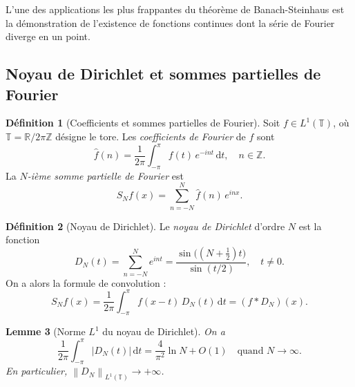 \documentclass[a4paper,12pt]{book}
\newcommand{\Z}{\mathbb{Z}}
\newcommand{\R}{\mathbb{R}}
\newcommand{\dd}{\mathrm{d}}
\newcommand{\norm}[1]{\left\| #1 \right\|}
\newcommand{\abs}[1]{\left| #1 \right|}
\theoremstyle{definition}
\newtheorem{definition}{Définition}[chapter]
\theoremstyle{plain}
\newtheorem{lemme}[definition]{Lemme}
\theoremstyle{remark}
\begin{document}

L'une des applications les plus frappantes du théorème de Banach-Steinhaus
est la démonstration de l'existence de fonctions continues dont la série de
Fourier diverge en un point.

\subsection{Noyau de Dirichlet et sommes partielles de Fourier}

\begin{definition}[Coefficients et sommes partielles de Fourier]
\label{def:fourier}
Soit $f \in L^1(\mathbb{T})$, où $\mathbb{T} = \R / 2\pi\Z$
désigne le tore. Les \emph{coefficients de Fourier} de $f$ sont
\[
  \hat{f}(n) = \frac{1}{2\pi} \int_{-\pi}^{\pi} f(t)\, e^{-int}\, \dd t,
  \quad n \in \Z.
\]
La \emph{$N$-ième somme partielle de Fourier} est
\[
  S_N f(x) = \sum_{n=-N}^{N} \hat{f}(n)\, e^{inx}.
\]
\end{definition}

\begin{definition}[Noyau de Dirichlet]
\label{def:noyau-dirichlet}
Le \emph{noyau de Dirichlet} d'ordre $N$ est la fonction
\[
  D_N(t) = \sum_{n=-N}^{N} e^{int} = \frac{\sin\bigl((N + \tfrac{1}{2})t\bigr)}{\sin(t/2)},
  \quad t \neq 0.
\]
On a alors la formule de convolution :
\[
  S_N f(x) = \frac{1}{2\pi} \int_{-\pi}^{\pi} f(x-t)\, D_N(t)\, \dd t
  = (f * D_N)(x).
\]
\end{definition}

\begin{lemme}[Norme $L^1$ du noyau de Dirichlet]
\label{lem:norme-dirichlet}
On a
\[
  \frac{1}{2\pi} \int_{-\pi}^{\pi} \abs{D_N(t)}\, \dd t
  = \frac{4}{\pi^2} \ln N + O(1) \quad \text{quand } N \to \infty.
\]
En particulier, $\norm{D_N}_{L^1(\mathbb{T})} \to +\infty$.
\end{lemme}
\end{document}
